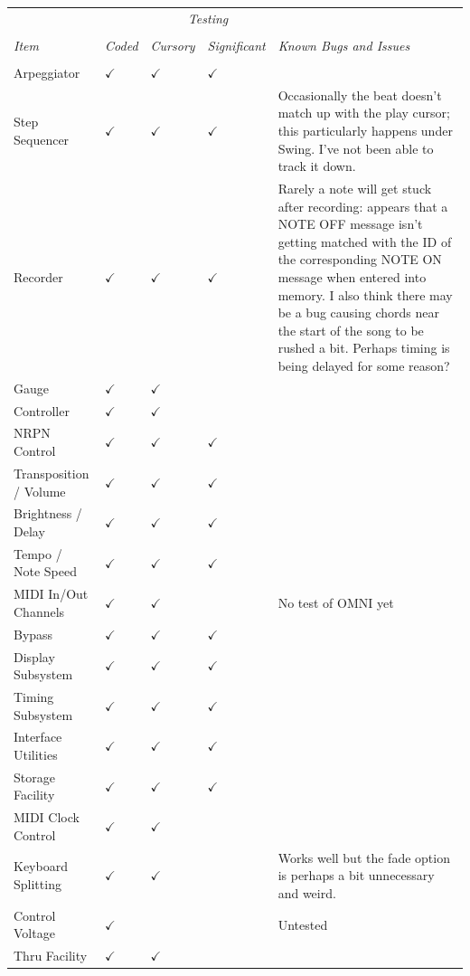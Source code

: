 \documentclass{article}
\begin{document}
\begin{center}
{
\setlength\extrarowheight{0.3em}
\begin{tabular}{@{}llllp{2.8in}@{}}
&&\multicolumn{2}{c}{\it Testing}&\\[0.1em]
\cline{3-4}\\[-0.9em]
{\it Item} & {\it Coded} & {\it Cursory} & {\it Significant} & {\it Known Bugs and Issues}\\[0.1em]
		\hline\\[-1.5em]
Arpeggiator& $\checkmark$ & $\checkmark$ & $\checkmark$  & \\
Step Sequencer& $\checkmark$ & $\checkmark$ & $\checkmark$ & Occasionally the beat doesn't match up with the play cursor; this particularly happens under Swing.  I've not been able to track it down.\\
Recorder& $\checkmark$ & $\checkmark$ & $\checkmark$ & Rarely a note will get stuck after recording: appears that a NOTE OFF message isn't getting matched with the ID of the corresponding NOTE ON message when entered into memory.  
I also think there may be a bug causing chords near the start of the song to be rushed a bit.  Perhaps timing is being delayed for some reason?\\
Gauge& $\checkmark$ & $\checkmark$ &\\ 
Controller& $\checkmark$ & $\checkmark$ & & \\ 
NRPN Control  &  $\checkmark$ & $\checkmark$ &  $\checkmark$ &\\
Transposition / Volume  &  $\checkmark$ & $\checkmark$ &  $\checkmark$ &\\
Brightness / Delay  &  $\checkmark$ & $\checkmark$ &  $\checkmark$ &\\
Tempo / Note Speed &  $\checkmark$ & $\checkmark$ &  $\checkmark$ &\\
MIDI In/Out Channels &  $\checkmark$ & $\checkmark$ &  & No test of OMNI yet\\
Bypass &  $\checkmark$ & $\checkmark$ &  $\checkmark$ &\\
Display Subsystem  &  $\checkmark$ & $\checkmark$ &  $\checkmark$ &\\
Timing  Subsystem &  $\checkmark$ & $\checkmark$ &  $\checkmark$ &\\
Interface Utilities &  $\checkmark$ & $\checkmark$ &  $\checkmark$ & \\
Storage Facility &  $\checkmark$ & $\checkmark$ &  $\checkmark$ &\\
MIDI Clock Control& $\checkmark$ & $\checkmark$ & &\\
Keyboard Splitting& $\checkmark$ & $\checkmark$  & & Works well but the fade option is perhaps a bit unnecessary and weird.\\
Control Voltage& $\checkmark$ & & & Untested\\
Thru Facility & $\checkmark$ & $\checkmark$ & & \\
\end{tabular}
}
\end{center}
\end{document}
